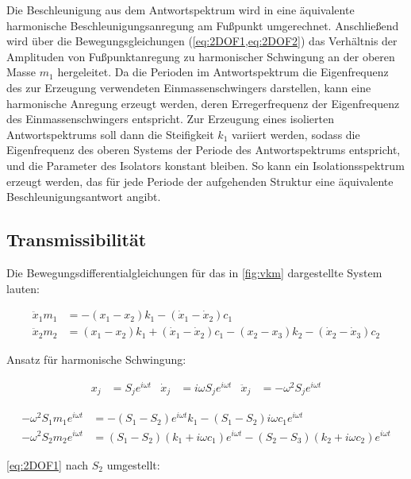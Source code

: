 Die Beschleunigung aus dem Antwortspektrum wird in eine äquivalente harmonische Beschleunigungsanregung am Fußpunkt umgerechnet.
Anschließend wird über die Bewegungsgleichungen (\cref{eq:2DOF1,eq:2DOF2}) das Verhältnis der Amplituden von Fußpunktanregung zu harmonischer Schwingung an der oberen Masse $m_1$ hergeleitet.
Da die Perioden im Antwortspektrum die Eigenfrequenz des zur Erzeugung verwendeten Einmassenschwingers darstellen, kann eine harmonische Anregung erzeugt werden, deren Erregerfrequenz der Eigenfrequenz des Einmassenschwingers entspricht.
Zur Erzeugung eines isolierten Antwortspektrums soll dann die Steifigkeit $k_1$ variiert werden, sodass die Eigenfrequenz des oberen Systems der Periode des Antwortspektrums entspricht, und die Parameter des Isolators konstant bleiben.
So kann ein Isolationsspektrum erzeugt werden, das für jede Periode der aufgehenden Struktur eine äquivalente Beschleunigungsantwort angibt.

\subsection{Transmissibilität}
\label{sec:transm}

Die Bewegungsdifferentialgleichungen für das in \cref{fig:vkm} dargestellte System lauten:

\begin{align}
\ddot x_1 m_1 &= -(x_1 - x_2) k_1 -(\dot x_1 - \dot x_2) c_1 \label{eq:BewegDGL1}\\
\ddot x_2 m_2 &= (x_1 - x_2) k_1 + (\dot x_1 - \dot x_2) c_1 - (x_2 - x_3) k_2 - (\dot x_2 - \dot x_3) c_2 \label{eq:BewegDGL2}
\end{align}

Ansatz für harmonische Schwingung:

\begin{align*}
x_j &= S_j e^{i \omega t} & \dot x_j &= i \omega S_j e^{i \omega t} & \ddot x_j &= - \omega^2 S_j e^{i \omega t}
\end{align*}

\begin{align}
- \omega^2 S_1 m_1 e^{i \omega t} &= - (S_1 - S_2) e^{i \omega t} k_1 - (S_1 - S_2) i \omega c_1 e^{i \omega t} \label{eq:2DOF1} \\
- \omega^2 S_2 m_2 e^{i \omega t} &= (S_1 - S_2)(k_1 + i \omega c_1) e^{i \omega t} - (S_2 - S_3)(k_2 + i \omega c_2) e^{i \omega t} \label{eq:2DOF2}
\end{align}

\cref{eq:2DOF1} nach $S_2$ umgestellt:

